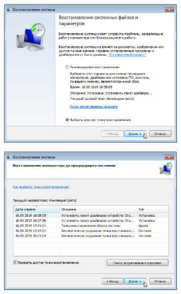 \documentclass[
	a4paper,
	oneside,
	BCOR = 10mm,
	DIV = 12,
	12pt,
	headings = normal,
]{scrartcl}
\newlength{\gridunitwidth}
\begin{document}
				\begin{figure}[!htbp]
					\begin{subfigure}[b]{5.5\gridunitwidth}
						\includegraphics[width=\columnwidth]{./assets/y04s01-infosec-lab-01-03-p16.png}
						\caption{}
						\label{subfig:04-sysrestore-01-01}
					\end{subfigure}%
					\hspace{1\gridunitwidth}%
					\begin{subfigure}[b]{5.5\gridunitwidth}
						\includegraphics[width=\columnwidth]{./assets/y04s01-infosec-lab-01-03-p17.png}
						\caption{}
						\label{subfig:04-sysrestore-01-02}
					\end{subfigure}


\end{figure}
\end{document}
